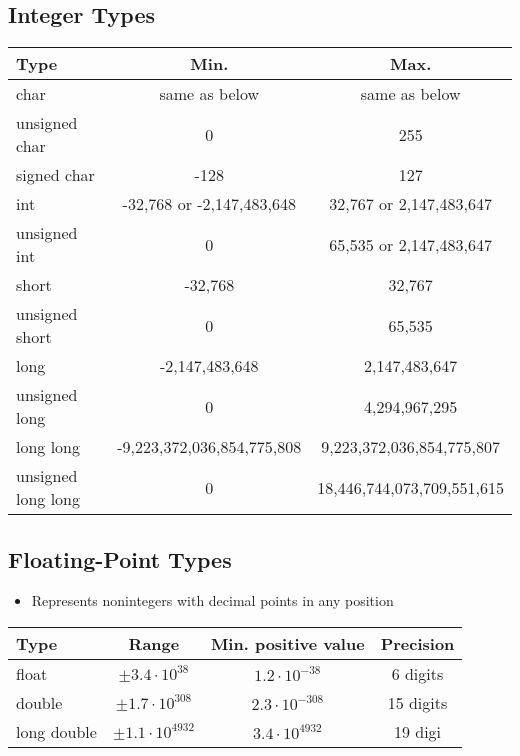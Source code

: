 \documentclass[a4wide,10pt]{article}
\begin{document}
		\subsection{Integer Types} %
		\label{sub:integer_types}
			\begin{tabular}{l c c}
				\textbf{Type} & \textbf{Min.} & \textbf{Max.} \\
				\hline \hline
				char & same as below & same as below\\
				\hline
				unsigned char & 0 & 255 \\
				\hline
				signed char & -128 & 127 \\
				\hline
				int & -32,768 or -2,147,483,648 & 32,767 or 2,147,483,647 \\
				\hline
				unsigned int & 0 & 65,535 or 2,147,483,647 \\
				\hline
				short & -32,768 & 32,767 \\
				\hline
				unsigned short & 0 & 65,535 \\
				\hline
				long & -2,147,483,648 & 2,147,483,647 \\
				\hline
				unsigned long & 0 & 4,294,967,295 \\
				\hline
				long long & -9,223,372,036,854,775,808 & 9,223,372,036,854,775,807 \\
				\hline
				unsigned long long & 0 & 18,446,744,073,709,551,615 \\
			\end{tabular}
		
		\subsection{Floating-Point Types} %
		\label{sub:floating_point_types}
			\begin{itemize}
				\item Represents nonintegers with decimal points in any position
			\end{itemize}
			\begin{tabular}{l c c c}
				\textbf{Type} & \textbf{Range} & \textbf{Min. positive value} & \textbf{Precision} \\
				\hline \hline
				float & $\pm 3.4 \cdot 10^{38}$ & $1.2 \cdot 10^{-38}$ & 6 digits \\
				\hline
				double & $\pm 1.7 \cdot 10^{308}$ & $2.3 \cdot 10^{-308}$ & 15 digits \\
				\hline
				long double & $\pm 1.1 \cdot 10^{4932}$ & $3.4 \cdot 10^{4932}$ & 19 digi \\
			\end{tabular}
		
\end{document}

